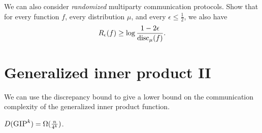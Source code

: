 \exercises

\begin{exercise}
	We can also consider \emph{randomized} multiparty communication protocols. Show that for every function $f$, every distribution $\mu$, and every $\epsilon \le \frac12$, we also have
	\[
	R_\epsilon(f) \ge \log \frac{1-2\epsilon}{\mathrm{disc}_\mu(f)}.
	\]
\end{exercise}



\section{Generalized inner product II}

We can use the discrepancy bound to give a lower bound on the communication complexity of the generalized inner product function.

\begin{theorem}
	$D(\textsc{GIP}^k) = \Omega(\frac{n}{4^k})$.
\end{theorem}

